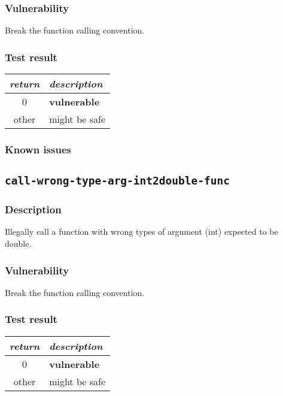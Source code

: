 \documentclass[a4paper]{book}
\begin{document}
\subsubsection{Vulnerability}
Break the function calling convention.

\subsubsection{Test result}
\begin{tabular}{cl}
  \toprule
  \emph{return}  & \emph{description} \\
  \midrule
  0              & \textbf{vulnerable} \\
  other          & might be safe \\
  \bottomrule
\end{tabular}

\subsubsection{Known issues}

\newpage
\subsection{\texttt{call-wrong-type-arg-int2double-func}}\label{test-call-wrong-type-arg-int2double-func}

\subsubsection{Description}
Illegally call a function with wrong types of argument (int) expected to be double.

\subsubsection{Vulnerability}
Break the function calling convention.

\subsubsection{Test result}
\begin{tabular}{cl}
  \toprule
  \emph{return}  & \emph{description} \\
  \midrule
  0              & \textbf{vulnerable} \\
  other          & might be safe \\
  \bottomrule
\end{tabular}
\end{document}
